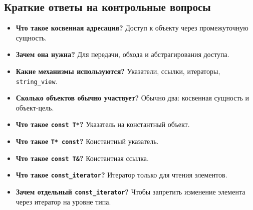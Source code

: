 \subsection{Краткие ответы на контрольные вопросы}
\begin{itemize}
    \item \textbf{Что такое косвенная адресация?} Доступ к объекту через промежуточную сущность.
    \item \textbf{Зачем она нужна?} Для передачи, обхода и абстрагирования доступа.
    \item \textbf{Какие механизмы используются?} Указатели, ссылки, итераторы, \texttt{string\_view}.
    \item \textbf{Сколько объектов обычно участвует?} Обычно два: косвенная сущность и объект-цель.
    \item \textbf{Что такое \texttt{const T*}?} Указатель на константный объект.
    \item \textbf{Что такое \texttt{T* const}?} Константный указатель.
    \item \textbf{Что такое \texttt{const T\&}?} Константная ссылка.
    \item \textbf{Что такое \texttt{const\_iterator}?} Итератор только для чтения элементов.
    \item \textbf{Зачем отдельный \texttt{const\_iterator}?} Чтобы запретить изменение элемента через итератор на уровне типа.
\end{itemize}
